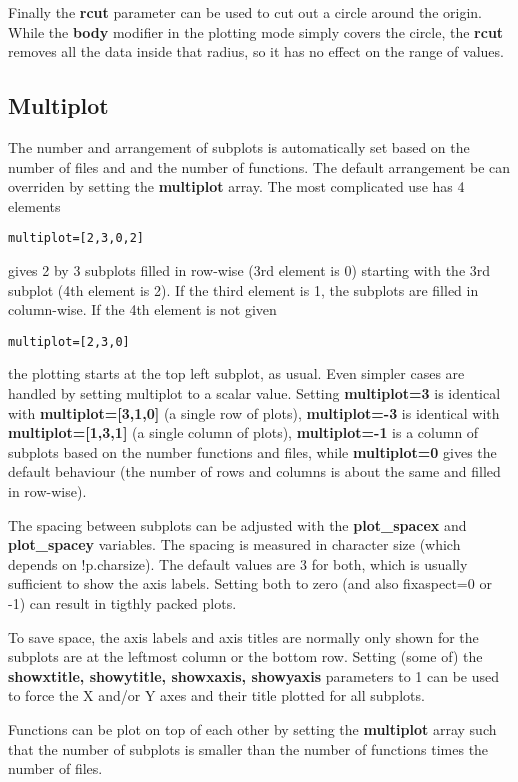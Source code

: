 \documentclass{article}
\begin{document}
Finally the {\bf rcut} parameter can be used to cut out a circle around
the origin. While the {\bf body} modifier in the plotting mode simply covers
the circle, the {\bf rcut} removes all the data inside that radius,
so it has no effect on the range of values.

\subsection{Multiplot \label{s-multiplot}}

The number and arrangement of subplots is automatically set based 
on the number of files and and the number of functions. 
The default arrangement be can overriden by setting the
{\bf multiplot} array. The most complicated use has 4 elements
\begin{verbatim}
multiplot=[2,3,0,2]
\end{verbatim} 
gives 2 by 3 subplots filled in row-wise (3rd element is 0) 
starting with the 3rd subplot (4th element is 2). If the third element is 1,
the subplots are filled in column-wise. If the 4th element is not given 
\begin{verbatim}
multiplot=[2,3,0]
\end{verbatim} 
the plotting starts at the top left subplot, as usual. Even simpler
cases are handled by setting multiplot to a scalar value.
Setting {\bf multiplot=3} is identical with {\bf multiplot=[3,1,0]} 
(a single row of plots), {\bf multiplot=-3} is identical with 
{\bf multiplot=[1,3,1]} (a single column of plots), 
{\bf multiplot=-1} is a column of subplots based on the number 
functions and files, while {\bf multiplot=0} gives the default
behaviour (the number of rows and columns is about the same and
filled in row-wise).

The spacing between subplots can be adjusted with the
{\bf plot\_spacex} and {\bf plot\_spacey} variables.
The spacing is measured in character size (which depends on !p.charsize).
The default values are 3 for both, which is usually sufficient to
show the axis labels. Setting both to zero (and also fixaspect=0 or -1)
can result in tigthly packed plots. 

To save space, the axis labels and axis titles are normally only shown 
for the subplots are at the leftmost column or the bottom row.
Setting (some of) the {\bf showxtitle, showytitle, showxaxis, showyaxis} 
parameters to 1 can be used to force the X and/or Y axes and their title plotted
for all subplots.

Functions can be plot on top of each other by setting the {\bf multiplot}
array such that the number of subplots is smaller than the number of
functions times the number of files.  
\end{document}
